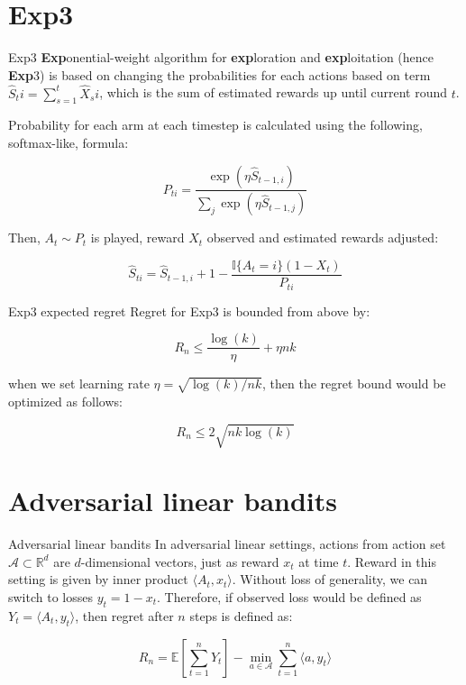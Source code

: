 \documentclass[aspectratio=169,xcolor=dvipsnames]{beamer}
\begin{document}
\section{Exp3}
\begin{frame}{Exp3}
    \textbf{Exp}onential-weight algorithm for \textbf{exp}loration and \textbf{exp}loitation (hence \textbf{Exp}3) is based on changing the probabilities for each actions based on term $\hat{S}_ti = \sum_{s=1}^{t} \hat{X}_si$, which is the sum of estimated rewards up until current round $t$.

    Probability for each arm at each timestep is calculated using the following, softmax-like, formula:

    \begin{equation}
        P_{ti} = \frac{\exp(\eta \hat{S}_{t-1, i})}{\sum_{j} \exp(\eta \hat{S}_{t-1, j})}
    \end{equation}

    Then, $A_t \sim P_t$ is played, reward $X_t$ observed and estimated rewards adjusted:

    \begin{equation}
        \hat{S}_{ti} = \hat{S}_{t-1, i} + 1 - \frac{\mathbb{I}\{ A_t = i \}(1 - X_t)}{P_{ti}}
    \end{equation}
\end{frame}

\begin{frame}{Exp3 expected regret}
    Regret for Exp3 is bounded from above by:

    \begin{equation}
        R_n \leq \frac{\log (k)}{\eta} + \eta nk
    \end{equation}

    when we set learning rate $\eta = \sqrt{\log(k)/nk}$, then the regret bound would be optimized as follows:

    \begin{equation}
        R_n \leq 2 \sqrt{nk \log(k)}
    \end{equation}
\end{frame}

\section{Adversarial linear bandits}
\begin{frame}{Adversarial linear bandits}
    In adversarial linear settings, actions from action set $\mathbf{\mathcal{A}} \subset \mathbb{R}^d$ are $d$-dimensional vectors, just as reward $x_t$ at time $t$. Reward in this setting is given by inner product $\langle A_t, x_t \rangle$. Without loss of generality, we can switch to losses $y_t = 1 - x_t$. Therefore, if observed loss would be defined as $Y_t = \langle A_t, y_t \rangle$, then regret after $n$ steps is defined as:

    \begin{equation}
        R_n = \mathbb{E} \left[ \sum_{t=1}^{n} Y_t \right] - \min_{a \in \mathbf{\mathcal{A}}} \sum_{t=1}^{n} \langle a, y_t \rangle
    \end{equation}
\end{frame}
\end{document}
